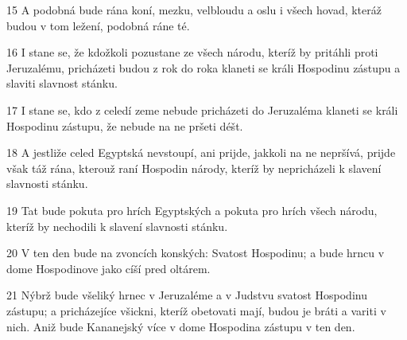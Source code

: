 \par 15 A podobná bude rána koní, mezku, velbloudu a oslu i všech hovad, kteráž budou v tom ležení, podobná ráne té.
\par 16 I stane se, že kdožkoli pozustane ze všech národu, kteríž by pritáhli proti Jeruzalému, pricházeti budou z rok do roka klaneti se králi Hospodinu zástupu a slaviti slavnost stánku.
\par 17 I stane se, kdo z celedí zeme nebude pricházeti do Jeruzaléma klaneti se králi Hospodinu zástupu, že nebude na ne pršeti déšt.
\par 18 A jestliže celed Egyptská nevstoupí, ani prijde, jakkoli na ne nepršívá, prijde však táž rána, kterouž raní Hospodin národy, kteríž by nepricházeli k slavení slavnosti stánku.
\par 19 Tat bude pokuta pro hrích Egyptských a pokuta pro hrích všech národu, kteríž by nechodili k slavení slavnosti stánku.
\par 20 V ten den bude na zvoncích konských: Svatost Hospodinu; a bude hrncu v dome Hospodinove jako cíší pred oltárem.
\par 21 Nýbrž bude všeliký hrnec v Jeruzaléme a v Judstvu svatost Hospodinu zástupu; a pricházejíce všickni, kteríž obetovati mají, budou je bráti a variti v nich. Aniž bude Kananejský více v dome Hospodina zástupu v ten den.


